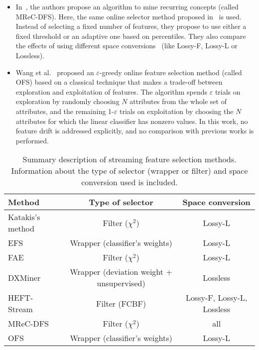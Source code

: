 \documentclass[preprint,12pt]{elsarticle}
\begin{document}
\begin{itemize}
	\item In~\cite{gomes14}, the authors propose an algorithm to mine recurring concepts (called MReC-DFS). Here, the same online selector method proposed in~\cite{kata05} is used. Instead of selecting a fixed number of features, they propose to use either a fixed threshold or an adaptive one based on percentiles. They also compare the effects of using different space conversions~\cite{masud10} (like Lossy-F, Lossy-L or Lossless).
	\item Wang et al.~\cite{wang14} proposed an $\varepsilon$-greedy online feature selection method (called OFS) based on a classical technique that makes a trade-off between exploration and exploitation of features. The algorithm spends $\varepsilon$ trials on exploration by randomly choosing $N$ attributes from the whole set of attributes, and the remaining 1-$\varepsilon$ trials on exploitation by choosing the $N$ attributes for which the linear classifier has nonzero values. %
In this work, no feature drift is addressed explicitly, and no comparison with previous works is performed.
\end{itemize}

\begin{table}[!htp]
\renewcommand{\arraystretch}{1.3}
\centering
\scriptsize
\caption{Summary description of streaming feature selection methods. Information about the type of selector (wrapper or filter) and space conversion used is included.}
\label{tab:fs}
\begin{tabular}{ lcc }
\toprule
{\bf Method} & {\bf Type of selector} & {\bf Space conversion}\\
\midrule
Katakis's method~\cite{kata05} & Filter ($\chi^2$) & Lossy-L\\
EFS~\cite{carva06} & Wrapper (classifier's weights) & Lossy-L\\
FAE~\cite{wener06} & Filter ($\chi^2$) & Lossy-L\\
DXMiner~\cite{masud10} & Wrapper (deviation weight + unsupervised) & Lossless\\
HEFT-Stream~\cite{nguyen12} & Filter (FCBF) & Lossy-F, Lossy-L, Lossless\\
MReC-DFS~\cite{gomes14} & Filter ($\chi^2$) & all\\
OFS~\cite{wang14} & Wrapper (classifier's weights) & Lossy-L\\
\bottomrule
\end{tabular}
\end{table}
\end{document}
